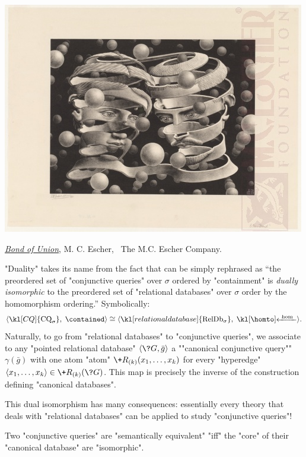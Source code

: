 \begin{marginfigure}
	\centering
	\includegraphics[width=\linewidth]{fig/escher/bound-of-union.jpg}
	\caption{\href{https://mcescher.com/gallery/most-popular/\#iLightbox[gallery\_image\_1]/23}{\emph{Bond of Union}}, M. C. Escher, \textcopyright~The M.C. Escher Company.}
\end{marginfigure}
"Duality" takes its name from the fact that  can be simply rephrased as
``the preordered set of "conjunctive queries" over $\sigma$ ordered by
"containment" is \emph{dually isomorphic} to the preordered set of "relational databases"
over $\sigma$  order by the homomorphism ordering.'' Symbolically: 
\[
	\tup{\kl[CQ]{\textrm{CQ}_\sigma},\; \contained }
	\cong
	\tup{\kl[relational database]{\textrm{RelDb}_\sigma},\; \cohomto }.
\]
Naturally, to go from "relational databases" to "conjunctive queries",
we associate to any "pointed relational database" $\tup{\?G, \bar g}$
a ""canonical conjunctive query"" $\gamma(\bar g)$ with one atom "atom"
$\+R_{(k)}(x_1,\hdots,x_k)$ for every "hyperedge" $\tup{x_1,\hdots,x_k} \in \+R_{(k)}(\?G)$.
This map is precisely the inverse of the construction defining "canonical databases".

This dual isomorphism has many consequences: essentially every theory that deals with
"relational databases" can be applied to study "conjunctive queries"!

\begin{corollary}
	Two "conjunctive queries" are "semantically equivalent" "iff"
	the "core" of their "canonical database" are "isomorphic".
\end{corollary}

